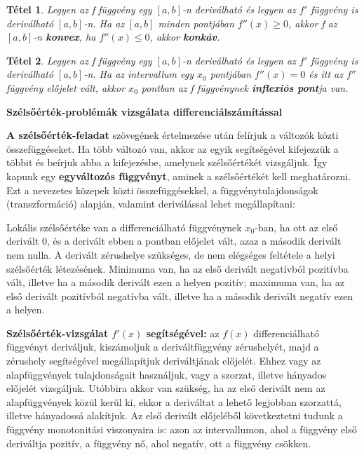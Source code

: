 \documentclass[12pt,a4paper]{article}
\newtheorem{theorem}{Tétel} [section]
\begin{document}
\begin{theorem}
Legyen az f függvény egy $[a, b]$-n deriválható és legyen az $f'$ függvény is deriválható $[a, b]$-n. Ha az $[a, b]$ minden pontjában $f''(x) \geq 0$, akkor f az $[a, b]$-n \textbf{konvex}, ha $f''(x) \leq 0$, akkor \textbf{konkáv}.
\end{theorem}

\begin{theorem}
Legyen az f függvény egy $[a, b]$-n deriválható és legyen az $f'$ függvény is deriválható $[a, b]$-n. Ha az intervallum egy $x_0$ pontjában $f''(x) = 0$ és itt az $f''$ függvény előjelet vált, akkor $x_0$ pontban az f függvénynek \textbf{inflexiós pont}ja van.
\end{theorem}
\newpage
\textbf{Szélsőérték-problémák vizsgálata differenciálszámítással}

\textbf{A szélsőérték-feladat} szövegének értelmezése után felírjuk a változók közti összefüggéseket. Ha több változó van, akkor az egyik segítségével kifejezzük a többit és beírjuk abba a kifejezésbe, amelynek szélsőértékét vizsgáljuk. Így kapunk egy \textbf{egyváltozós függvényt}, aminek a szélsőértékét kell meghatározni. Ezt a nevezetes közepek közti összefüggésekkel, a függvénytulajdonságok (transzformáció) alapján, valamint deriválással lehet megállapítani:

Lokális szélsőértéke van a differenciálható függvénynek $x_0$-ban, ha ott az első derivált 0, és a derivált ebben a pontban előjelet vált, azaz a második derivált nem nulla. A derivált zérushelye szükséges, de nem elégséges feltétele a helyi szélsőérték létezésének. Minimuma van, ha az első derivált negatívból pozitívba vált, illetve ha a második derivált ezen a helyen pozitív; maximuma van, ha az első derivált pozitívból negatívba vált, illetve ha a második derivált negatív ezen a helyen.

\textbf{Szélsőérték-vizsgálat $f'(x)$ segítségével:} az $f(x)$ differenciálható függvényt deriváljuk, kiszámoljuk a deriváltfüggvény zérushelyét, majd a zérushely segítségével megállapítjuk deriváltjának előjelét. Ehhez vagy az alapfüggvények tulajdonságait használjuk, vagy a szorzat, illetve hányados előjelét vizsgáljuk. Utóbbira akkor van szükség, ha az első derivált nem az alapfüggvények közül kerül ki, ekkor a deriváltat a lehető legjobban szorzattá, illetve hányadossá alakítjuk. Az első derivált előjeléből következtetni tudunk a függvény monotonitási viszonyaira is: azon az intervallumon, ahol a függvény első deriváltja pozitív, a függvény nő, ahol negatív, ott a függvény csökken.
\end{document}
